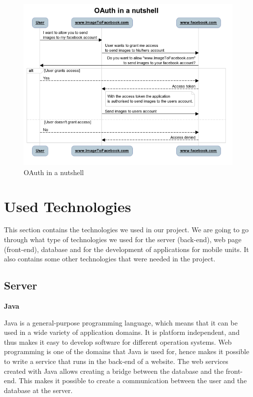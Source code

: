 \begin{figure}[H]
\centering
\includegraphics[scale=1.0]{../Figures/oauth-in-a-nutshell.png}
\caption{OAuth in a nutshell}
\label{figure:oauth-in-a-nutshell}
\end{figure}


\clearpage
\section{Used Technologies}
\label{section:used-technologies}

This section contains the technologies we used in our project.
We are going to go through what type of technologies we used for the server (back-end), web page (front-end), database and for the development of applications for mobile units. 
It also contains some other technologies that were needed in the project.

\subsection{Server}

\textbf{Java}

Java is a general-purpose programming language, which means that it can be used in a wide variety of application domains.
It is platform independent, and thus makes it easy to develop software for different operation systems.
Web programming is one of the domains that Java is used for, hence makes it possible to write a service that runs in the back-end of a website.
The web services created with Java allows creating a bridge between the database and the front-end. 
This makes it possible to create a communication between the user and the database at the server. \cite{Java}

